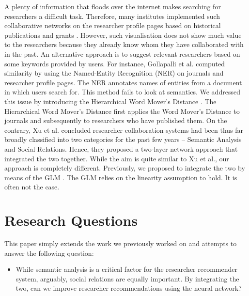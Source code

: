 \documentclass[a4paper,11pt]{article}
\begin{document}
A plenty of information that floods over the internet makes searching for researchers a difficult task. Therefore, many institutes implemented such collaborative networks on the researcher profile pages based on historical publications and grants \cite{scientific-collaboration}. However, such visualisation
does not show much value to the researchers because they already know whom they have collaborated with in the past. An alternative approach is to suggest relevant researchers based on some keywords provided by users. For instance, Gollapalli et al.\cite{Similar-Researcher-Search-in-Academic-Environments} computed similarity by using the Named-Entity Recognition (NER) on journals and researcher profile pages. The NER annotates names of entities from a document in which users search for. This method fails to look at semantics. We addressed this issue by introducing the Hierarchical Word Mover’s Distance \cite{Hierarchical-Word-Mover-Distance-for-Collaboration-Recommender-System, Academic-Capability-Mapping}. The Hierarchical Word Mover’s Distance first applies the Word Mover’s Distance \cite{From-Word-Embeddings-to-Document-Distances} to journals and subsequently to researchers who have published them. On the contrary, Xu et al.\cite{Combining-social-network-and-semantic-concept-analysis-for-personalized-academic-researcher-recommendation} concluded researcher collaboration systems had been thus far broadly classified into two categories for the past few years -- Semantic Analysis and Social Relations. Hence, they proposed a two-layer network approach that integrated the two together. While the aim is quite similar to Xu et al.\cite{Combining-social-network-and-semantic-concept-analysis-for-personalized-academic-researcher-recommendation}, our approach is completely different. Previously, we proposed to integrate the two by means of the GLM \cite{Academic-Capability-Mapping}. The GLM relies on the linearity assumption to hold. It is often not the case.

\section{Research Questions}

This paper simply extends the work we previously worked on and attempts to answer the following question:

\begin{itemize}
	\item While semantic analysis is a critical factor for the researcher recommender system, arguably, social relations are equally important. By integrating the two, can we improve researcher recommendations using the neural network? 
\end{itemize}

\medskip

\end{document}
